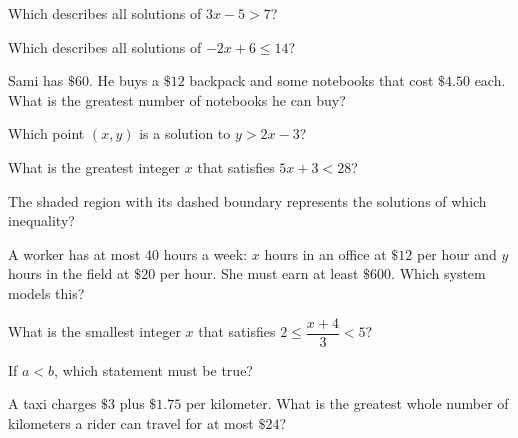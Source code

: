 \begin{exo}{}
Which describes all solutions of $3x-5>7$?
\end{exo}
\begin{exo}{}
Which describes all solutions of $-2x+6\le14$?
\end{exo}
\begin{exo}{}
Sami has $\$60$. He buys a $\$12$ backpack and some notebooks that cost $\$4.50$ each. What is the greatest number of notebooks he can buy?
\end{exo}
\begin{exo}{}
Which point $(x,y)$ is a solution to $y>2x-3$?
\end{exo}
\begin{exo}{\sprtag}
What is the greatest integer $x$ that satisfies $5x+3<28$?
\end{exo}
\begin{exo}{}
The shaded region with its dashed boundary represents the solutions of which inequality?
\end{exo}
\begin{exo}{}
A worker has at most 40 hours a week: $x$ hours in an office at $\$12$ per hour and $y$ hours in the field at $\$20$ per hour. She must earn at least $\$600$. Which system models this?
\end{exo}
\begin{exo}{\sprtag}
What is the smallest integer $x$ that satisfies $2\le\dfrac{x+4}{3}<5$?
\end{exo}
\begin{exo}{}
If $a<b$, which statement must be true?
\end{exo}
\begin{exo}{\sprtag}
A taxi charges $\$3$ plus $\$1.75$ per kilometer. What is the greatest whole number of kilometers a rider can travel for at most $\$24$?
\end{exo}
